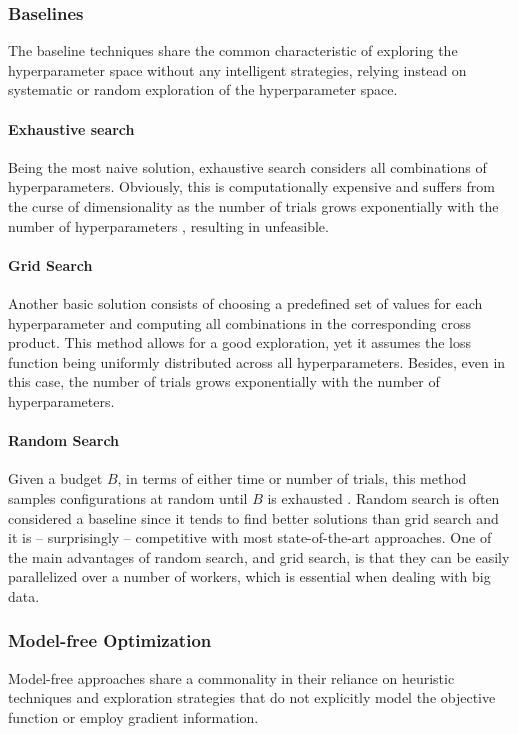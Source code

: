 \subsubsection{Baselines}
The baseline techniques share the common characteristic of exploring the hyperparameter space without any intelligent strategies, relying instead on systematic or random exploration of the hyperparameter space.

\paragraph{Exhaustive search}
Being the most naive solution, exhaustive search considers all combinations of hyperparameters.
Obviously, this is computationally expensive and suffers from the curse of dimensionality as the number of trials grows exponentially with the number of hyperparameters \cite{bittner1962r}, resulting in unfeasible.

\paragraph{Grid Search}
Another basic solution consists of choosing a predefined set of values for each hyperparameter and computing all combinations in the corresponding cross product.
This method allows for a good exploration, yet it assumes the loss function being uniformly distributed across all hyperparameters.
Besides, even in this case, the number of trials grows exponentially with the number of hyperparameters.

\paragraph{Random Search}
Given a budget $B$, in terms of either time or number of trials, this method samples configurations at random until $B$ is exhausted \cite{bergstra2012random}.
Random search is often considered a baseline since it tends to find better solutions than grid search \cite{montgomery-book13a} and it is -- surprisingly -- competitive with most state-of-the-art approaches.
One of the main advantages of random search, and grid search, is that they can be easily parallelized over a number of workers, which is essential when dealing with big data.

\subsubsection{Model-free Optimization}
Model-free approaches share a commonality in their reliance on heuristic techniques and exploration strategies that do not explicitly model the objective function or employ gradient information.

